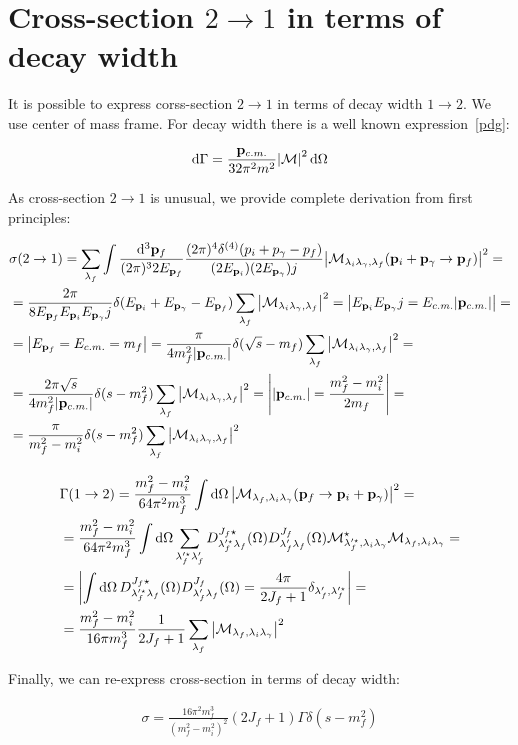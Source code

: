 \section{Cross-section $2 \rightarrow 1$ in terms of decay width}

It is possible to express corss-section $2 \rightarrow 1$ in terms of decay width $1 \rightarrow 2$. We use center of mass frame. For decay width there is a well known expression~\ref{pdg}:

\begin{align}
    \dd{\Gamma} = \frac{\mathbf{p}_{c.m.}}{32 \pi^2 m^2} \abs{\mathcal{M}}^2 \dd{\Omega}
\end{align}

As cross-section $2 \rightarrow 1$ is unusual, we provide complete derivation from first principles:

\begin{align}
        &\sigma(2 \rightarrow 1) = \sum_{\lambda_f} \int \frac{\dd[3]{\mathbf{p}_f}}{(2 \pi)^3 2 E_{\mathbf{p}_f}} \frac{(2\pi)^4 \delta^{(4)}(p_i + p_\gamma - p_f)}{(2 E_{\mathbf{p}_{i}}) (2 E_{\mathbf{p}_{\gamma}}) j} \abs{\mathcal{M}_{\lambda_i \lambda_\gamma, \lambda_f}(\mathbf{p}_i + \mathbf{p}_\gamma \rightarrow \mathbf{p}_f)}^2 = \\
        &= \frac{2\pi}{8 E_{\mathbf{p}_{f}} E_{\mathbf{p}_{i}} E_{\mathbf{p}_{\gamma}} j} \delta(E_{\mathbf{p}_{i}} + E_{\mathbf{p}_{\gamma}} - E_{\mathbf{p}_{f}}) \sum_{\lambda_f} \abs{\mathcal{M}_{\lambda_i \lambda_\gamma, \lambda_f}}^2 = \left| E_{\mathbf{p}_{i}} E_{\mathbf{p}_{\gamma}} j = E_{c.m.} \abs{\mathbf{p}_{c.m.}} \right| = \\
        &= \left| E_{\mathbf{p}_{f}} = E_{c.m.} = m_f \right| = \frac{\pi}{4 m_f^2 \abs{\mathbf{p}_{c.m.}}} \delta(\sqrt{s} - m_f) \sum_{\lambda_f} \abs{\mathcal{M}_{\lambda_i \lambda_\gamma, \lambda_f}}^2 = \\
        &= \frac{2 \pi \sqrt{s}}{4 m_f^2 \abs{\mathbf{p}_{c.m.}}} \delta(s - m_f^2) \sum_{\lambda_f} \abs{\mathcal{M}_{\lambda_i \lambda_\gamma, \lambda_f}}^2 = \left| \abs{\mathbf{p}_{c.m.}} = \frac{m_f^2 - m_i^2}{2 m_f} \right| =\\
        &= \frac{\pi}{m_f^2 - m_i^2} \delta(s - m_f^2) \sum_{\lambda_f} \abs{\mathcal{M}_{\lambda_i \lambda_\gamma, \lambda_f}}^2
\end{align}

\begin{align}
        &\Gamma(1 \rightarrow 2) =  \frac{m_f^2 - m_i^2}{64 \pi^2 m_f^3} \int \dd{\Omega} \abs{\mathcal{M}_{\lambda_f, \lambda_i \lambda_\gamma}(\mathbf{p}_f \rightarrow \mathbf{p}_i + \mathbf{p}_\gamma)}^2 = \\
        &= \frac{m_f^2 - m_i^2}{64 \pi^2 m_f^3} \int \dd{\Omega} \sum_{\lambda_f^{\prime \star} \lambda_f^{\prime}} D^{J_f \star}_{\lambda^{\prime \star}_f \lambda_f}(\Omega) D^{J_f}_{\lambda^{\prime}_f \lambda_f}(\Omega) \mathcal{M}^\star_{\lambda^{\prime \star}_f, \lambda_i \lambda_\gamma} \mathcal{M}_{\lambda_f, \lambda_i \lambda_\gamma} = \\
        &= \left| \int \dd{\Omega}D^{J_f \star}_{\lambda^{\prime \star}_f \lambda_f}(\Omega) D^{J_f}_{\lambda^{\prime}_f \lambda_f}(\Omega) = \frac{4 \pi}{2J_f + 1} \delta_{\lambda_f^\prime, \lambda_f^{\prime \star}}  \right| = \\
        &= \frac{m_f^2 - m_i^2}{16 \pi m_f^3} \frac{1}{2J_f + 1} \sum_{\lambda_f} \abs{\mathcal{M}_{\lambda_f, \lambda_i \lambda_\gamma}}^2
\end{align}

Finally, we can re-express cross-section in terms of decay width:

\begin{align} \label{eq:app:crsc-dw}
    \sigma = \frac{16 \pi^2 m_f^3}{(m_f^2 - m_i^2)^2} (2J_f + 1) \Gamma \delta(s - m_f^2)
\end{align}
